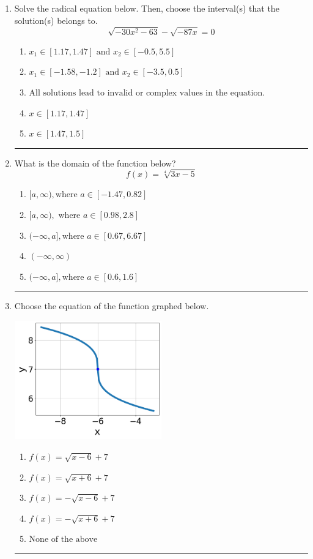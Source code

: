 \documentclass[14pt]{extbook}
\newcommand{\litem}[1]{\item#1\hspace*{-1cm}\rule{\textwidth}{0.4pt}}
\begin{document}
\begin{enumerate}
\litem{
Solve the radical equation below. Then, choose the interval(s) that the solution(s) belongs to.\[ \sqrt{-30 x^2 - 63} - \sqrt{-87 x} = 0 \]\begin{enumerate}[label=\Alph*.]
\item \( x_1 \in [1.17, 1.47] \text{ and } x_2 \in [-0.5,5.5] \)
\item \( x_1 \in [-1.58, -1.2] \text{ and } x_2 \in [-3.5,0.5] \)
\item \( \text{All solutions lead to invalid or complex values in the equation.} \)
\item \( x \in [1.17,1.47] \)
\item \( x \in [1.47,1.5] \)

\end{enumerate} }
\litem{
What is the domain of the function below?\[ f(x) = \sqrt[4]{3 x - 5} \]\begin{enumerate}[label=\Alph*.]
\item \( [a, \infty), \text{where } a \in [-1.47, 0.82] \)
\item \( [a, \infty), \text{ where } a \in [0.98, 2.8] \)
\item \( (-\infty, a], \text{where } a \in [0.67, 6.67] \)
\item \( (-\infty, \infty) \)
\item \( (-\infty, a], \text{where } a \in [0.6, 1.6] \)

\end{enumerate} }
\litem{
Choose the equation of the function graphed below.
\begin{center}
    \includegraphics[width=0.5\textwidth]{../Figures/radicalGraphToEquationC.png}
\end{center}
\begin{enumerate}[label=\Alph*.]
\item \( f(x) = \sqrt{x - 6} + 7 \)
\item \( f(x) = \sqrt{x + 6} + 7 \)
\item \( f(x) = - \sqrt{x - 6} + 7 \)
\item \( f(x) = - \sqrt{x + 6} + 7 \)
\item \( \text{None of the above} \)


\end{enumerate}}
\end{enumerate}
\end{document}
